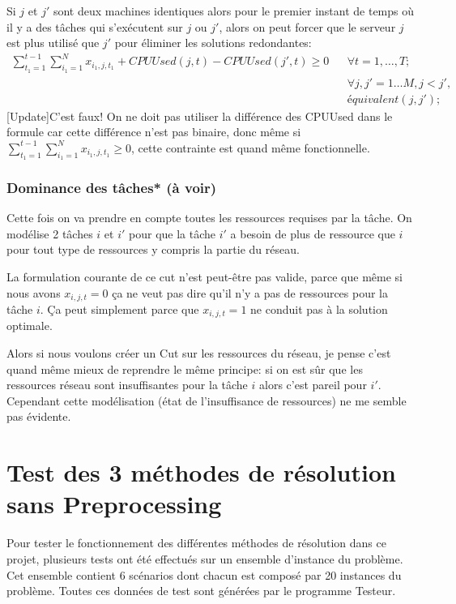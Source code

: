 \documentclass[twoside,fleqn]{EPURapport}
\begin{document}
Si $j$ et $j'$ sont deux machines identiques alors pour le premier instant de temps où il y a des tâches qui s'exécutent sur $j$ ou $j'$, alors on peut forcer que le serveur $j$ est plus utilisé que $j'$ pour éliminer les solutions redondantes:
\begin{align}
\sum_{t_1=1}^{t-1}\sum_{i_1=1}^{N}x_{i_1,j,t_1}+ CPUUsed(j,t)-CPUUsed(j',t) \geq 0
 && \forall t=1,\ldots,T;   \nonumber \\
 && \forall j,j'=1\ldots M, j<j', \nonumber \\
 && équivalent(j,j');
\end{align}
[Update]C'est faux! On ne doit pas utiliser la différence des CPUUsed dans le formule car cette différence n'est pas binaire, donc même si $\sum_{t_1=1}^{t-1}\sum_{i_1=1}^{N}x_{i_1,j,t_1} \geq 0$, cette contrainte est quand même fonctionnelle.

\subsection{Dominance des tâches* (à voir)}
Cette fois on va prendre en compte toutes les ressources requises par la tâche. On modélise 2 tâches $i$ et $i\prime$ pour que la tâche $i\prime$ a besoin de plus de ressource que $i$ pour tout type de ressources y compris la partie du réseau.

La formulation courante de ce cut n'est peut-être pas valide, parce que même si nous avons $x_{i,j,t}=0$ ça ne veut pas dire qu'il n'y a pas de ressources pour la tâche $i$. Ça peut simplement parce que $x_{i,j,t}=1$ ne conduit pas à la solution optimale.

Alors si nous voulons créer un Cut sur les ressources du réseau, je pense c'est quand même mieux de reprendre le même principe: si on est sûr que les ressources réseau sont insuffisantes pour la tâche $i$ alors c'est pareil pour $i\prime$. Cependant cette modélisation (état de l'insuffisance de ressources) ne me semble pas évidente.


\chapter{Test des 3 méthodes de résolution sans Preprocessing}%
Pour tester le fonctionnement des différentes méthodes de résolution dans ce projet, plusieurs tests ont été effectués sur un ensemble d'instance du problème. Cet ensemble contient 6 scénarios dont chacun est composé par 20 instances du problème. Toutes ces données de test sont générées par le programme Testeur.
\end{document}
